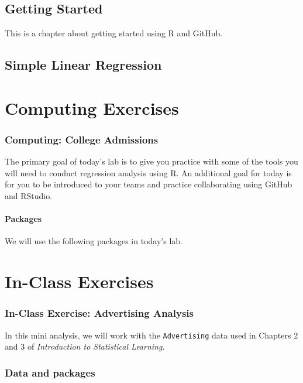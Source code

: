 \documentclass[]{book}
\begin{document}
\chapter{Getting Started}\label{getstarted}

This is a chapter about getting started using R and GitHub.

\chapter{Simple Linear Regression}\label{slr}

\part*{Computing Exercises}\label{part-computing-exercises}

\section{Computing: College
Admissions}\label{computing-college-admissions}

The primary goal of today's lab is to give you practice with some of the
tools you will need to conduct regression analysis using R. An
additional goal for today is for you to be introduced to your teams and
practice collaborating using GitHub and RStudio.

\subsection{Packages}\label{packages}

We will use the following packages in today's lab.

\part*{In-Class Exercises}\label{part-in-class-exercises}

\section{In-Class Exercise: Advertising
Analysis}\label{in-class-exercise-advertising-analysis}

In this mini analysis, we will work with the \texttt{Advertising} data
used in Chapters 2 and 3 of \emph{Introduction to Statistical Learning}.

\section{Data and packages}\label{data-and-packages}
\end{document}

